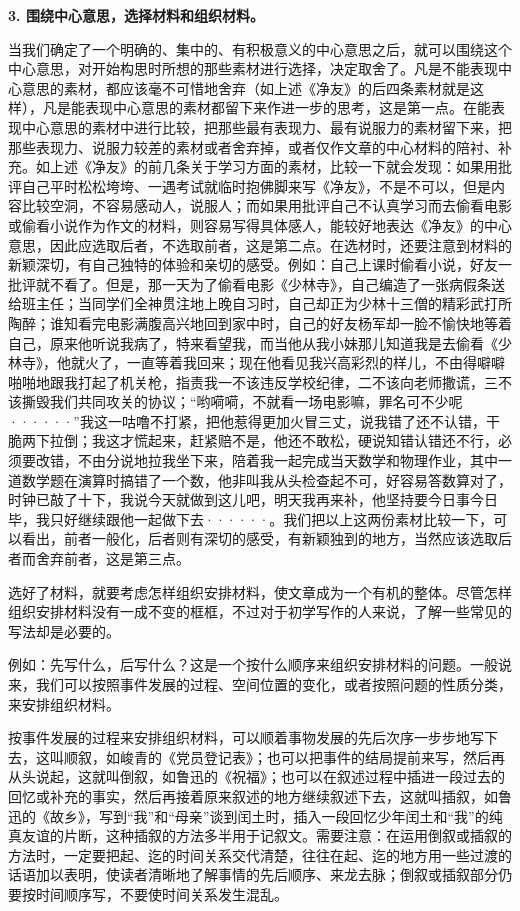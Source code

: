 \textbf{3. 围绕中心意思，选择材料和组织材料。}

当我们确定了一个明确的、集中的、有积极意义的中心意思之后，就可以围绕这个中心意思，对开始构思时所想的那些素材进行选择，决定取舍了。凡是不能表现中心意思的素材，都应该毫不可惜地舍弃（如上述《净友》的后四条素材就是这样），凡是能表现中心意思的素材都留下来作进一步的思考，这是第一点。在能表现中心意思的素材中进行比较，把那些最有表现力、最有说服力的素材留下来，把那些表现力、说服力较差的素材或者舍弃掉，或者仅作文章的中心材料的陪衬、补充。如上述《净友》的前几条关于学习方面的素材，比较一下就会发现：如果用批评自己平时松松垮垮、一遇考试就临时抱佛脚来写《净友》，不是不可以，但是内容比较空洞，不容易感动人，说服人；而如果用批评自己不认真学习而去偷看电影或偷看小说作为作文的材料，则容易写得具体感人，能较好地表达《净友》的中心意思，因此应选取后者，不选取前者，这是第二点。在选材时，还要注意到材料的新颖深切，有自己独特的体验和亲切的感受。例如：自己上课时偷看小说，好友一批评就不看了。但是，那一天为了偷看电影《少林寺》，自己编造了一张病假条送给班主任；当同学们全神贯注地上晚自习时，自己却正为少林十三僧的精彩武打所陶醉；谁知看完电影满腹高兴地回到家中时，自己的好友杨军却一脸不愉快地等着自己，原来他听说我病了，特来看望我，而当他从我小妹那儿知道我是去偷看《少林寺》，他就火了，一直等着我回来；现在他看见我兴高彩烈的样儿，不由得噼噼啪啪地跟我打起了机关枪，指责我一不该违反学校纪律，二不该向老师撒谎，三不该撕毁我们共同攻关的协议；“哟嗬嗬，不就看一场电影嘛，罪名可不少呢······”我这一咕噜不打紧，把他惹得更加火冒三丈，说我错了还不认错，干脆两下拉倒；我这才慌起来，赶紧赔不是，他还不敢松，硬说知错认错还不行，必须要改错，不由分说地拉我坐下来，陪着我一起完成当天数学和物理作业，其中一道数学题在演算时搞错了一个数，他非叫我从头检查起不可，好容易答数算对了，时钟已敲了十下，我说今天就做到这儿吧，明天我再来补，他坚持要今日事今日毕，我只好继续跟他一起做下去······。我们把以上这两份素材比较一下，可以看出，前者一般化，后者则有深切的感受，有新颖独到的地方，当然应该选取后者而舍弃前者，这是第三点。

选好了材料，就要考虑怎样组织安排材料，使文章成为一个有机的整体。尽管怎样组织安排材料没有一成不变的框框，不过对于初学写作的人来说，了解一些常见的写法却是必要的。

例如：先写什么，后写什么？这是一个按什么顺序来组织安排材料的问题。一般说来，我们可以按照事件发展的过程、空间位置的变化，或者按照问题的性质分类，来安排组织材料。

按事件发展的过程来安排组织材料，可以顺着事物发展的先后次序一步步地写下去，这叫顺叙，如峻青的《党员登记表》；也可以把事件的结局提前来写，然后再从头说起，这就叫倒叙，如鲁迅的《祝福》；也可以在叙述过程中插进一段过去的回忆或补充的事实，然后再接着原来叙述的地方继续叙述下去，这就叫插叙，如鲁迅的《故乡》，写到“我”和“母亲”谈到闰土时，插入一段回忆少年闰土和“我”的纯真友谊的片断，这种插叙的方法多半用于记叙文。需要注意：在运用倒叙或插叙的方法时，一定要把起、迄的时间关系交代清楚，往往在起、迄的地方用一些过渡的话语加以表明，使读者清晰地了解事情的先后顺序、来龙去脉；倒叙或插叙部分仍要按时间顺序写，不要使时间关系发生混乱。

